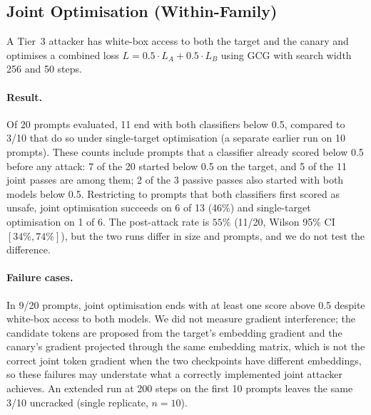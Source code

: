 \documentclass{article}
\begin{document}
\subsection{Joint Optimisation (Within-Family)}
\label{sec:joint-gcg}

A Tier~3 attacker has white-box access to both the target and the canary and optimises a combined loss $L = 0.5 \cdot L_A + 0.5 \cdot L_B$ using GCG with search width 256 and 50 steps.

\paragraph{Result.} Of 20 prompts evaluated, 11 end with both classifiers below 0.5, compared to 3/10 that do so under single-target optimisation (a separate earlier run on 10 prompts). These counts include prompts that a classifier already scored below 0.5 before any attack: 7 of the 20 started below 0.5 on the target, and 5 of the 11 joint passes are among them; 2 of the 3 passive passes also started with both models below 0.5. Restricting to prompts that both classifiers first scored as unsafe, joint optimisation succeeds on 6 of 13 (46\%) and single-target optimisation on 1 of 6. The post-attack rate is $55\%$ (11/20, Wilson 95\% CI $[34\%, 74\%]$), but the two runs differ in size and prompts, and we do not test the difference.

\paragraph{Failure cases.} In 9/20 prompts, joint optimisation ends with at least one score above 0.5 despite white-box access to both models. We did not measure gradient interference; the candidate tokens are proposed from the target's embedding gradient and the canary's gradient projected through the same embedding matrix, which is not the correct joint token gradient when the two checkpoints have different embeddings, so these failures may understate what a correctly implemented joint attacker achieves. An extended run at 200 steps on the first 10 prompts leaves the same 3/10 uncracked (single replicate, $n = 10$).
\end{document}
